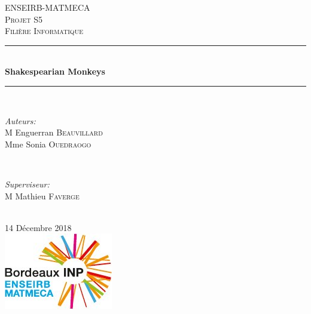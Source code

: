 \documentclass[12pt]{article}
\begin{document}
\begin{titlepage}

\newcommand{\HRule}{\rule{\linewidth}{0.5mm}} %

\center %
 

\textsc{\LARGE ENSEIRB-MATMECA}\\[1.5cm] %
\textsc{\Large Projet S5}\\[0.5cm] %
\textsc{\large Filière Informatique}\\[0.5cm] %


\HRule \\[0.4cm]
{\huge \bfseries Shakespearian Monkeys}\\[0.4cm] 
\HRule \\[1.5cm]
 

\begin{minipage}{0.4\textwidth}
\begin{flushleft} \large
\emph{Auteurs:}\\
M Enguerran \textsc{Beauvillard} \\%
Mme Sonia \textsc{Ouedraogo} %
\end{flushleft}
\end{minipage}
~
\begin{minipage}{0.4\textwidth}
\begin{flushright} \large
\emph{Superviseur:} \\
M Mathieu \textsc{Faverge}
\end{flushright}
\end{minipage}\\[2cm]

{\large 14 Décembre 2018}\\[2cm]

\includegraphics{logo-eirb.jpg}\\[1cm]
 
\vfill
\end{titlepage}
\end{document}
